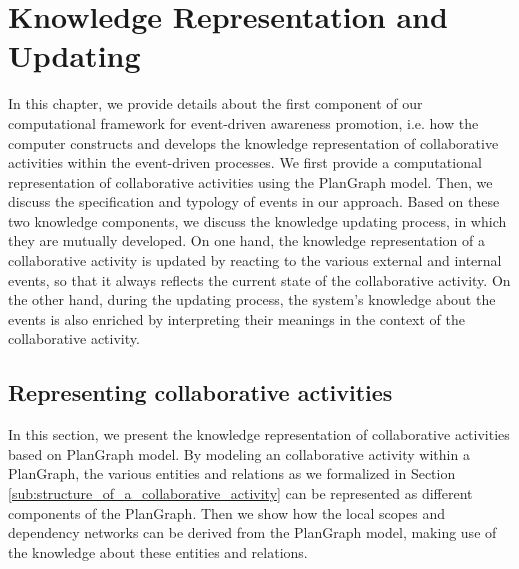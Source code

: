 \graphicspath{{Figures/}}

\chapter{Knowledge Representation and Updating} %
\label{cha:knowledge_reprsentation_and_updating}
In this chapter, we provide details about the first component of our computational framework for event-driven awareness promotion, i.e. how the computer constructs and develops the knowledge representation of collaborative activities within the event-driven processes. We first provide a computational representation of collaborative activities using the PlanGraph model. Then, we discuss the specification and typology of events in our approach. Based on these two knowledge components, we discuss the knowledge updating process, in which they are mutually developed. On one hand, the knowledge representation of a collaborative activity is updated by reacting to the various external and internal events, so that it always reflects the current state of the collaborative activity. On the other hand, during the updating process, the system's knowledge about the events is also enriched by interpreting their meanings in the context of the collaborative activity.

\section{Representing collaborative activities} %
\label{sec:representing_the_field_of_work}
In this section, we present the knowledge representation of collaborative activities based on PlanGraph model. By modeling an collaborative activity within a PlanGraph, the various entities and relations as we formalized in Section \ref{sub:structure_of_a_collaborative_activity} can be represented as different components of the PlanGraph. Then we show how the local scopes and dependency networks can be derived from the PlanGraph model, making use of the knowledge about these entities and relations.


